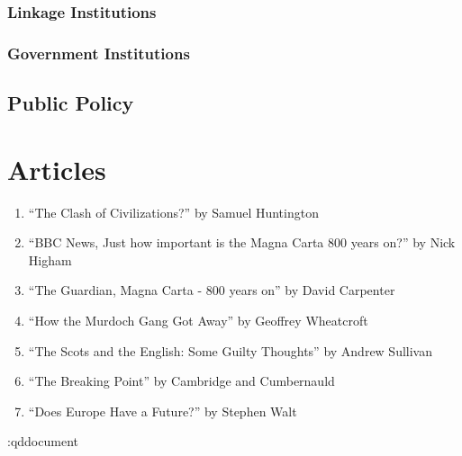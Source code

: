 \documentclass[11 pt, twoside]{article}
\newenvironment{outline*}
{
	\begin{outline}[enumerate]
	}
	{\end{outline}
}
\begin{document}
\subsubsection{Linkage Institutions}
\begin{outline*}

\end{outline*}
\subsubsection{Government Institutions}
\begin{outline*}

\end{outline*}
\subsection{Public Policy}
\begin{outline*}

\end{outline*}
\section{Articles}
\begin{enumerate}
\item \hypertarget{1}{``The Clash of Civilizations?'' by Samuel Huntington}
\item \hypertarget{2}{``BBC News, Just how important is the Magna Carta 800 years on?'' by Nick Higham}
\item \hypertarget{3}{``The Guardian, Magna Carta - 800 years on'' by David Carpenter}
\item \hypertarget{4}{``How the Murdoch Gang Got Away'' by Geoffrey Wheatcroft}
\item \hypertarget{5}{``The Scots and the English: Some Guilty Thoughts'' by Andrew Sullivan}
\item \hypertarget{6}{``The Breaking Point'' by Cambridge and Cumbernauld}
\item \hypertarget{7}{``Does Europe Have a Future?'' by Stephen Walt}
\end{enumerate}

\en:qd{document}
\end{document}
